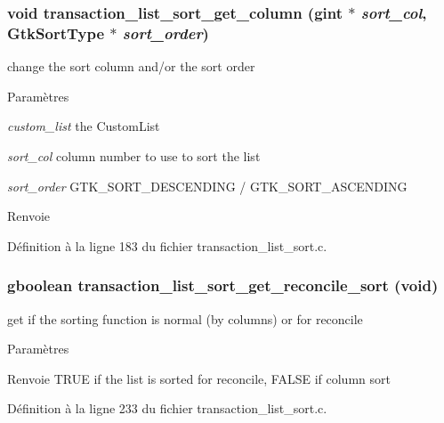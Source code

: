 \subsubsection[{transaction\_\-list\_\-sort\_\-get\_\-column}]{\setlength{\rightskip}{0pt plus 5cm}void transaction\_\-list\_\-sort\_\-get\_\-column (gint $\ast$ {\em sort\_\-col}, \/  GtkSortType $\ast$ {\em sort\_\-order})}\label{transaction__list__sort_8c_ae3160f04fcf15af961324f65b9759799}
change the sort column and/or the sort order


\begin{DoxyParams}{Paramètres}
\item[{\em custom\_\-list}]the CustomList \item[{\em sort\_\-col}]column number to use to sort the list \item[{\em sort\_\-order}]GTK\_\-SORT\_\-DESCENDING / GTK\_\-SORT\_\-ASCENDING\end{DoxyParams}
\begin{DoxyReturn}{Renvoie}

\end{DoxyReturn}


Définition à la ligne 183 du fichier transaction\_\-list\_\-sort.c.

\subsubsection[{transaction\_\-list\_\-sort\_\-get\_\-reconcile\_\-sort}]{\setlength{\rightskip}{0pt plus 5cm}gboolean transaction\_\-list\_\-sort\_\-get\_\-reconcile\_\-sort (void)}\label{transaction__list__sort_8c_a436b2ef3d8acb82f320e2b9fe2e6c8c6}
get if the sorting function is normal (by columns) or for reconcile


\begin{DoxyParams}{Paramètres}
\item[{\em }]\end{DoxyParams}
\begin{DoxyReturn}{Renvoie}
TRUE if the list is sorted for reconcile, FALSE if column sort 
\end{DoxyReturn}


Définition à la ligne 233 du fichier transaction\_\-list\_\-sort.c.

